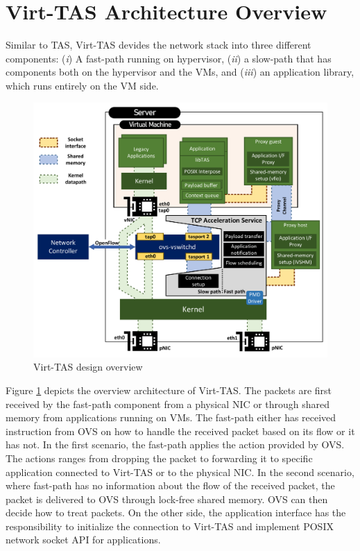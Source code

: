 \section{Virt-TAS Architecture Overview}

Similar to TAS, Virt-TAS devides the network stack into three different components:
(\emph{i}) A fast-path running on hypervisor, (\emph{ii}) a slow-path that has components
both on the hypervisor and the VMs, and (\emph{iii}) an application library, which 
runs entirely on the VM side. 



\begin{figure}
    \centering
    \includegraphics[scale=0.324]{../Figures/design.bigpicture.v2.pdf}
    \caption{Virt-TAS design overview}
    \label{fig:virttas.design.overview}
\end{figure}


Figure \ref{fig:virttas.design.overview} depicts the overview architecture of Virt-TAS. The packets are first received 
by the fast-path component from a physical NIC or through shared memory from applications 
running on VMs. The fast-path either has received instruction from OVS on how to handle 
the received packet based on its flow or it has not. In the first scenario, the fast-path 
applies the action provided by OVS. The actions ranges from dropping the packet to forwarding 
it to specific application connected to Virt-TAS or to the physical NIC. In the second 
scenario, where fast-path has no information about the flow of the received packet,  the 
packet is delivered to OVS through lock-free shared memory. OVS can then decide how to treat 
packets. On the other side, the application interface has the responsibility to initialize the 
connection to Virt-TAS and implement POSIX network socket API for applications.

